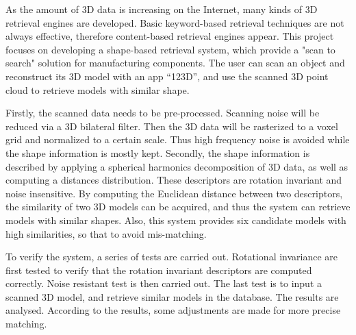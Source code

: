 As the amount of 3D data is increasing on the Internet, many kinds of 3D retrieval engines are developed. Basic keyword-based retrieval techniques are not always effective, therefore content-based retrieval engines appear. This project focuses on developing a shape-based retrieval system, which provide a "scan to search" solution for manufacturing components. The user can scan an object and reconstruct its 3D model with an app ``123D'', and use the scanned 3D point cloud to retrieve models with similar shape. 

Firstly, the scanned data needs to be pre-processed. Scanning noise will be reduced via a 3D bilateral filter. Then the 3D data will be rasterized to a voxel grid and normalized to a certain scale. Thus high frequency noise is avoided while the shape information is mostly kept. Secondly, the shape information is described by applying a spherical harmonics decomposition of 3D data, as well as computing a distances distribution. These descriptors are rotation invariant and noise insensitive. By computing the Euclidean distance between two descriptors, the similarity of two 3D models can be acquired, and thus the system can retrieve models with similar shapes. Also, this system provides six candidate models with high similarities, so that to avoid mis-matching. 

To verify the system, a series of tests are carried out. Rotational invariance are first tested to verify that the rotation invariant descriptors are computed correctly. Noise resistant test is then carried out. The last test is to input a scanned 3D model, and retrieve similar models in the database. The results are analysed. According to the results, some adjustments are made for more precise matching. 